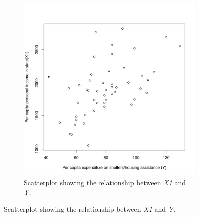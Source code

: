 \documentclass[12pt,letterpaper]{article}
\begin{document}
\begin{enumerate}
\begin{figure}[h]
\begin{subfigure}{0.48\textwidth}
				\includegraphics[width=\linewidth]{scatter_plot_2_3a.pdf}
				\caption{Scatterplot showing the relationship between \emph{X1} and \emph{Y}.}
			\end{subfigure}
		\end{figure}
		
\end{enumerate}
\end{document}
